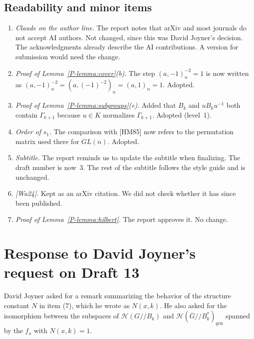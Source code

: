 \documentclass[12pt,letterpaper]{amsart}
\begin{document}
\subsection*{Readability and minor items}
\begin{enumerate}[leftmargin=1.5em]
\item \emph{Claude on the author line.} The report notes that arXiv and
most journals do not accept AI authors. Not changed, since this was
David Joyner's decision. The acknowledgments already describe the AI
contributions. A version for submission would need the change.
\item \emph{Proof of Lemma~\ref{P-lemma:cover}(b).} The step
$(a,-1)_n^{-2}=1$ is now written as
$(a,-1)_n^{-2}=(a,(-1)^{-2})_n=(a,1)_n=1$. Adopted.
\item \emph{Proof of Lemma~\ref{P-lemma:subgroups}(e).} Added that
$B_k$ and $uB_ku^{-1}$ both contain $\Gamma_{k+1}$ because $u\in K$
normalizes $\Gamma_{k+1}$. Adopted (level~1).
\item \emph{Order of $s_1$.} The comparison with [HM85] now refers to
the permutation matrix used there for $GL(n)$. Adopted.
\item \emph{Subtitle.} The report reminds us to update the subtitle when
finalizing. The draft number is now~3. The rest of the subtitle follows
the style guide and is unchanged.
\item \emph{[Wa24].} Kept as an arXiv citation. We did not check
whether it has since been published.
\item \emph{Proof of Lemma~\ref{P-lemma:hilbert}.} The report approves
it. No change.
\end{enumerate}

\section{Response to David Joyner's request on Draft 13}
\label{sec:d13request}

David Joyner asked for a remark summarizing the behavior of the
structure constant $N$ in item (7), which he wrote as $N(x,k)$. He also
asked for the isomorphism between the subspaces of $\mathcal{H}(G/\!/B_k)$ and
$\mathcal{H}(\overline{G}/\!/B_k^*)_{\mathrm{gen}}$
spanned by the $f_x$ with $N(x,k)=1$.
\end{document}
